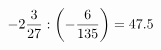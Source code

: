 \documentclass[preview]{standalone}
\begin{document}
\begin{align*}
-2 { 3 \over 27 }  :  \left( - { 6 \over 135 } \right) = 47.5
\end{align*}
\end{document}
